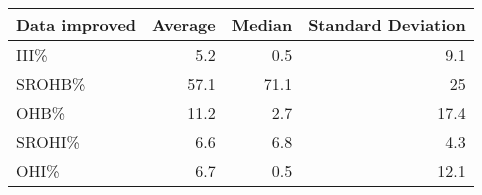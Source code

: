 \begin{tabular}{|l|r|r|r|}
\hline
 Data improved   &   Average &   Median &   Standard Deviation \\
\hline
 III\%            &       5.2 &      0.5 &                  9.1 \\
\hline
 SROHB\%          &      57.1 &     71.1 &                 25   \\
\hline
 OHB\%            &      11.2 &      2.7 &                 17.4 \\
\hline
 SROHI\%          &       6.6 &      6.8 &                  4.3 \\
\hline
 OHI\%            &       6.7 &      0.5 &                 12.1 \\
\hline
\end{tabular}
